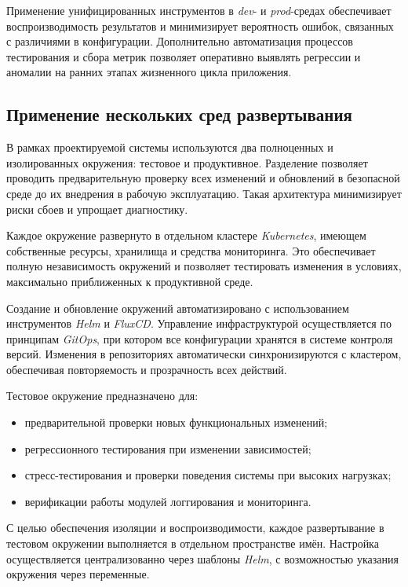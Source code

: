 Применение унифицированных инструментов в \textit{dev}- и \textit{prod}-средах обеспечивает воспроизводимость результатов и минимизирует вероятность ошибок, связанных с различиями в конфигурации. Дополнительно автоматизация процессов тестирования и сбора метрик позволяет оперативно выявлять регрессии и аномалии на ранних этапах жизненного цикла приложения.

\subsection{Применение нескольких сред развертывания}

В рамках проектируемой системы используются два полноценных и изолированных окружения: тестовое и продуктивное. Разделение позволяет проводить предварительную проверку всех изменений и обновлений в безопасной среде до их внедрения в рабочую эксплуатацию. Такая архитектура минимизирует риски сбоев и упрощает диагностику.

Каждое окружение развернуто в отдельном кластере \textit{Kubernetes}, имеющем собственные ресурсы, хранилища и средства мониторинга. Это обеспечивает полную независимость окружений и позволяет тестировать изменения в условиях, максимально приближенных к продуктивной среде.

Создание и обновление окружений автоматизировано с использованием инструментов \textit{Helm} и \textit{FluxCD}. Управление инфраструктурой осуществляется по принципам \textit{GitOps}, при котором все конфигурации хранятся в системе контроля версий. Изменения в репозиториях автоматически синхронизируются с кластером, обеспечивая повторяемость и прозрачность всех действий.

Тестовое окружение предназначено для:
\begin{itemize}
    \item предварительной проверки новых функциональных изменений;
    \item регрессионного тестирования при изменении зависимостей;
    \item стресс-тестирования и проверки поведения системы при высоких нагрузках;
    \item верификации работы модулей логгирования и мониторинга.
\end{itemize}

С целью обеспечения изоляции и воспроизводимости, каждое развертывание в тестовом окружении выполняется в отдельном пространстве имён. Настройка осуществляется централизованно через шаблоны \textit{Helm}, с возможностью указания окружения через переменные.

